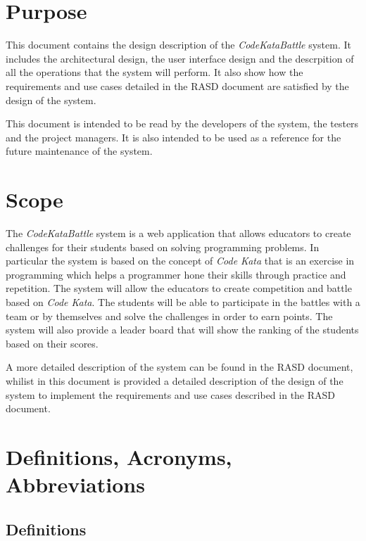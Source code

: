\section{Purpose}
\label{s:Purpose}%

This document contains the design description of the \emph{CodeKataBattle} system. It includes the architectural design, the user interface design and the descrpition of all the operations that the system will perform. It also show how the requirements and use cases detailed in the RASD document are satisfied by the design of the system.

This document is intended to be read by the developers of the system, the testers and the project managers. It is also intended to be used as a reference for the future maintenance of the system.

\section{Scope}
\label{s:Scope}%

The \emph{CodeKataBattle} system is a web application that allows educators to create challenges for their students based on solving programming problems. In particular the system is based on the concept of \emph{Code Kata} that is an exercise in programming which helps a programmer hone their skills through practice and repetition. The system will allow the educators to create competition and battle based on \emph{Code Kata}. The students will be able to participate in the battles with a team or by themselves and solve the challenges in order to earn points. The system will also provide a leader board that will show the ranking of the students based on their scores.

A more detailed description of the system can be found in the RASD document, whilist in this document is provided a detailed description of the design of the system to implement the requirements and use cases described in the RASD document.

\section{Definitions, Acronyms, Abbreviations}
\label{s:definitions-acronyms-abbreviations}%
\subsection{Definitions}
\label{ss:Definitions}

